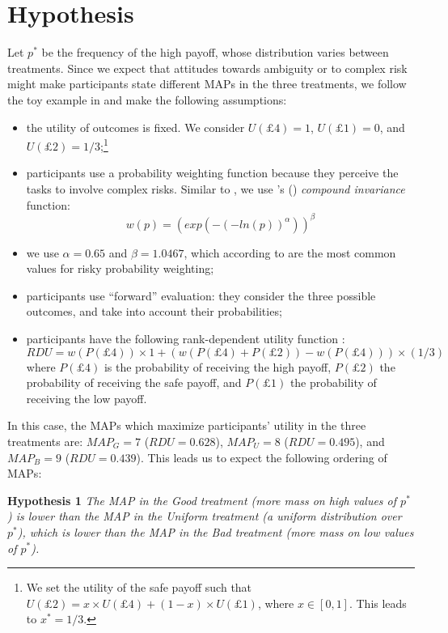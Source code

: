 \section{Hypothesis}\label{sec:hyp}
Let $p^*$ be the frequency of the high payoff, whose distribution varies between treatments.
Since we expect that attitudes towards ambiguity or to complex risk might make participants state different MAPs in the three treatments, we follow the toy example in \cite{Li2020a} and make the following assumptions:
\begin{itemize}
\item the utility of outcomes is fixed. We consider $U(\pounds4) = 1$, $U(\pounds1) = 0$, and $U(\pounds2) = 1/3$;\footnote{
We set the utility of the safe payoff such that $U(\pounds2) = x \times U(\pounds4) + (1-x) \times U(\pounds1)$, where $x \in [0,1]$.
This leads to $x^* = 1/3$.
}
\item participants use a probability weighting function because they perceive the tasks to involve complex risks. Similar to \cite{Li2020a}, we use \citeauthor{Prelec1998}'s (\citeyear{Prelec1998}) \textit{compound invariance} function:
$$w(p) = (exp(-(-ln(p))^\alpha))^\beta$$ 
\item we use $\alpha = 0.65$ and $\beta = 1.0467$, which according to \cite{Li2020a} are the most common values for risky probability weighting;
\item participants use ``forward'' evaluation: they consider the three possible outcomes, and take into account their probabilities;
\item participants have the following rank-dependent utility function \citep{Schmeidler1989}:
$$RDU = w(P(\pounds4)) \times 1 + (w(P(\pounds4) + P(\pounds2)) - w(P(\pounds4))) \times (1/3)$$
where $P(\pounds4)$ is the probability of receiving the high payoff, $P(\pounds2)$ the probability of receiving the safe payoff, and $P(\pounds1)$ the probability of receiving the low payoff.
\end{itemize}

In this case, the MAPs which maximize participants' utility in the three treatments are: $MAP_G = 7$ ($RDU = 0.628$), $MAP_U = 8$ ($RDU = 0.495$), and $MAP_B = 9$ ($RDU = 0.439$).
This leads us to expect the following ordering of MAPs:

\noindent \textbf{Hypothesis 1} \quad \textit{The MAP in the Good treatment (more mass on high values of $p^*$) is lower than the MAP in the Uniform treatment (a uniform distribution over $p^*$), which is lower than the MAP in the Bad treatment (more mass on low values of $p^*$).}

